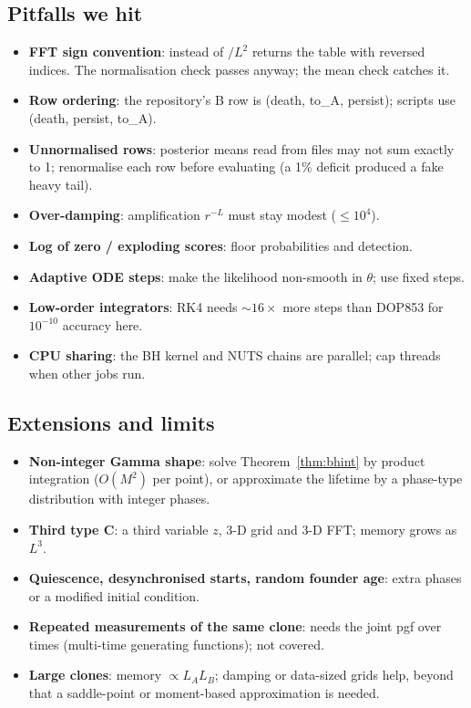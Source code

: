 \documentclass[11pt]{article}
\theoremstyle{definition}
\theoremstyle{remark}
\newcommand{\code}[1]{\texttt{\detokenize{#1}}}
\begin{document}
\subsection{Pitfalls we hit}
\begin{itemize}
\item \textbf{FFT sign convention}: \code{ifft2} instead of \code{fft2}$/L^2$ returns the table with reversed indices. The normalisation check passes anyway; the mean check catches it.
\item \textbf{Row ordering}: the repository's B row is (death, to\_A, persist); scripts use (death, persist, to\_A).
\item \textbf{Unnormalised rows}: posterior means read from files may not sum exactly to 1; renormalise each row before evaluating (a 1\% deficit produced a fake heavy tail).
\item \textbf{Over-damping}: amplification $r^{-L}$ must stay modest ($\le10^4$).
\item \textbf{Log of zero / exploding scores}: floor probabilities and detection.
\item \textbf{Adaptive ODE steps}: make the likelihood non-smooth in $\theta$; use fixed steps.
\item \textbf{Low-order integrators}: RK4 needs $\sim16\times$ more steps than DOP853 for $10^{-10}$ accuracy here.
\item \textbf{CPU sharing}: the BH kernel and NUTS chains are parallel; cap threads when other jobs run.
\end{itemize}

\subsection{Extensions and limits}
\begin{itemize}
\item \textbf{Non-integer Gamma shape}: solve Theorem~\ref{thm:bhint} by product integration ($O(M^2)$ per point), or approximate the lifetime by a phase-type distribution with integer phases.
\item \textbf{Third type C}: a third variable $z$, 3-D grid and 3-D FFT; memory grows as $L^3$.
\item \textbf{Quiescence, desynchronised starts, random founder age}: extra phases or a modified initial condition.
\item \textbf{Repeated measurements of the same clone}: needs the joint pgf over times (multi-time generating functions); not covered.
\item \textbf{Large clones}: memory $\propto L_AL_B$; damping or data-sized grids help, beyond that a saddle-point or moment-based approximation is needed.
\end{itemize}
\end{document}
